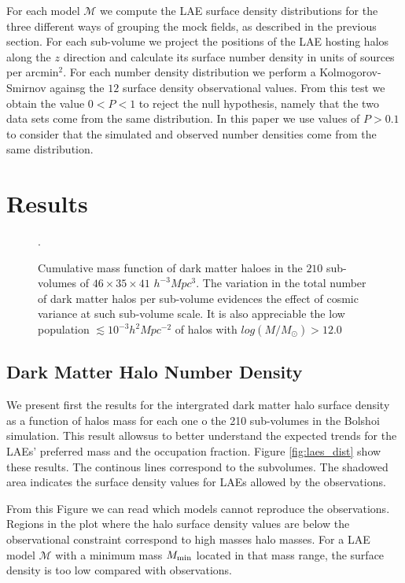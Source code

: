 \documentclass{emulateapj}
\begin{document}
For each model ${\mathcal M}$ we compute the LAE surface density
distributions for the three different ways of grouping the mock
fields, as described in the previous section. For each sub-volume we
project the positions of the LAE hosting halos along the $z$ direction
and calculate its surface number density in units of sources per
arcmin$^{2}$. For each number density distribution we perform a
Kolmogorov-Smirnov againsg the $12$ surface density observational
values. From this test we obtain the value $0<P<1$ to reject the null
hypothesis, namely that the two data sets come from the same
distribution. In this paper we use values of $P>0.1$ to consider that
the simulated and observed number densities come from the same
distribution. 

\section{Results}


\begin{figure}
\begin{center}
\caption{ \label{figure:laes_dist} Cumulative mass function of dark
  matter haloes in the $210$ sub-volumes of $46\times 35\times 41$
  $h^{-3}Mpc^{3}$. The variation in the total number of dark matter
  halos per sub-volume  evidences the effect of cosmic variance at
  such sub-volume scale. It is also appreciable the low population
  $\lesssim10^{-3}h^{2}Mpc^{-2}$ of halos with
  $log(M/M_{\odot})>12.0$}. 
\end{center} 
\end{figure}


\subsection{Dark Matter Halo Number Density}
We present first the results for  the intergrated dark matter halo surface
density as a function of halos mass for each one o the 210 sub-volumes in
the Bolshoi simulation. This result allowsus to better understand the
expected trends for the LAEs' preferred mass and the occupation
fraction. Figure \ref{fig:laes_dist} show these results. The continous lines
correspond to the subvolumes. The shadowed area indicates the surface
density values for LAEs allowed by the observations. 

From this Figure we can read which models cannot reproduce the
observations. Regions in the plot where the halo surface density
values are below the observational constraint correspond to high
masses halo masses. For a LAE model ${\mathcal M}$ with a minimum mass
$M_{\rm   min}$ located in that mass range, the surface density is too
low compared with observations. 
\end{document}
